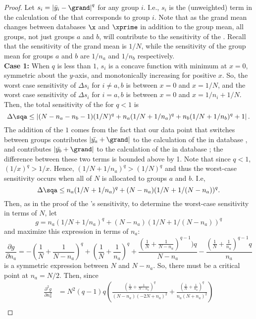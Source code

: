 \begin{proof}
Let $s_{i} =  \left\vert \bar{y}_{i} - \grand \right\vert ^q$ for any group $i$. I.e., $s_{i}$ is the (unweighted) term in the calculation of the \sqa that corresponds to group $i$. Note that as the grand mean changes between databases $\x$ and $\xprime$ in addition to the group mean, all groups, not just groups $a$ and $b$, will contribute to the sensitivity of the \sqa. Recall that the sensitivity of the grand mean is $1/N$, while the sensitivity of the group mean for groups $a$ and $b$ are $1/n_a$ and $1/n_b$ respectively. \\

\noindent\textbf{Case 1:} When $q$ is less than $1$, $s_i$ is a concave function with minimum at $x=0$, symmetric about the $y$-axis, and monotonically increasing for positive $x$. So, the worst case sensitivity of $\Delta s_i$ for $i \ne a,b$ is between $x=0$ and $x=1/N$, and the worst case sensitivity of $\Delta s_i$ for $i = a,b$ is between $x=0$ and $x=1/n_i + 1/N$. Then, the total sensitivity of the \sqa for $q<1$ is
%
$$ \Delta\sqa \le \left\vert (N-n_a-n_b-1)(1/N)^q + n_a(1/N + 1/n_a)^q + n_b(1/N + 1/n_b)^q + 1\right\vert. $$
%
The addition of the $1$ comes from the fact that our data point that switches between groups contributes $\vert \bar{y_a} + \grand \vert$ to the calculation of the \sqa in database \x, and contributes $\vert \bar{y_b} + \grand \vert$ to the calculation of the \sqa in database \xprime; the difference between these two terms is bounded above by 1. Note that since $q<1$, $(1/x)^q > 1/x$. Hence, $(1/N + 1/n_a)^q > (1/N)^q$ and thus the worst-case sensitivity occurs when all of $N$ is allocated to groups $a$ and $b$. I.e,
%
$$ \Delta\sqa \le n_a(1/N + 1/n_a)^q + (N-n_a)(1/N + 1/(N-n_a))^q. $$
Then, as in the proof of the \sqe's sensitivity, to determine the worst-case sensitivity in terms of $N$, let 
$$g = n_a(1/N + 1/n_a)^q + (N-n_a)(1/N + 1/(N-n_a))^q $$
and maximize this expression in terms of $n_a$:
$$ \frac{\partial g}{\partial n_a} = -\left(\frac{1}{N} + \frac{1}{N-n_a}\right)^q + \left(\frac{1}{N} + \frac{1}{n_a}\right)^q + \frac{(\frac{1}{N} + \frac{1}{N-n_a})^{q-1})q}{N-n_a} - \frac{(\frac{1}{N} + \frac{1}{n_a})^{q-1}q}{n_a}$$
is a symmetric expression between $N$ and $N-n_a$. So, there must be a critical point at $n_a = N/2$. Then, since
\begin{align*}
\frac{\partial^2 g}{\partial n_a^2} &= N^2(q-1)q \left( \frac{(\frac{1}{N} + \frac{1}{N-n_a})^q}{(N-n_a)(-2N+n_a)^2} + \frac{\left(\frac{1}{N} + \frac{1}{n_a}\right)^q}{n_a(N+n_a)^2}\right) \\

\end{align*}
\end{proof}
